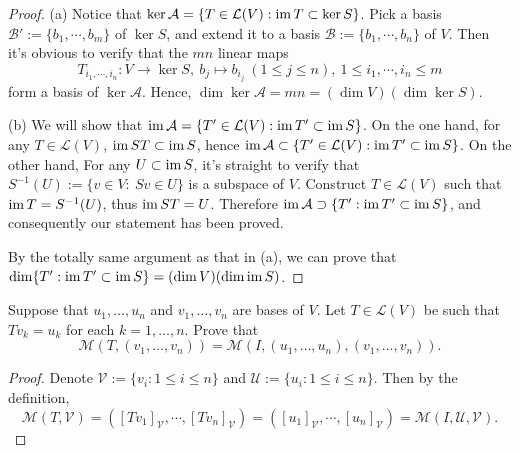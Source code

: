 \documentclass{article}
\begin{document}
\begin{proof}
    (a) Notice that \( \ker \mathcal{A}=\left\{T\in \mathcal{L}(V):\operatorname{im} T\subset\ker S\right\} \). Pick a basis \( \mathcal{B'}:=\{b_1,\cdots,b_m\} \) of \( \ker S \), and extend it to a basis \( \mathcal{B}:=\{b_1,\cdots,b_n\} \) of \( V \). Then it's obvious to verify that the \( mn \) linear maps
    \[ T_{i_1,\cdots,i_n}:V\to\ker S,\ b_j\mapsto b_{i_j}\ (1\le j\le n),\ 1\le i_1,\cdots,i_n\le m  \] 
    form a basis of \( \ker \mathcal{A} \). Hence, \( \dim\ker\mathcal{A}=mn=(\dim V)(\dim\ker S) \). \par
    (b) We will show that \( \operatorname{im} \mathcal{A}=\{T'\in \mathcal{L}(V):\operatorname{im} T'\subset\operatorname{im} S\} \). On the one hand, for any \( T\in \mathcal{L}(V) \), \( \operatorname{im} ST\subset\operatorname{im} S \), hence \( \operatorname{im} \mathcal{A}\subset\{T'\in \mathcal{L}(V):\operatorname{im} T'\subset\operatorname{im} S\} \). On the other hand, For any \( U\subset\operatorname{im} S \), it's straight to verify that \( S^{-1}(U):=\{v\in V:\ Sv\in U\} \) is a subspace of \( V \). Construct \( T\in \mathcal{L}(V) \) such that \( \operatorname{im} T=S^{-1}(U) \), thus \( \operatorname{im} ST=U \). Therefore \( \operatorname{im} \mathcal{A}\supset\{T':\operatorname{im} T'\subset\operatorname{im} S\} \), and consequently our statement has been proved.\par
    By the totally same argument as that in (a), we can prove that \( \dim \{T':\operatorname{im} T'\subset\operatorname{im} S\}=(\dim V)(\dim\operatorname{im} S) \). 
\end{proof}

\begin{problem}[3D-23]
    Suppose that \( u_1,\ldots,u_n \) and \( v_1,\ldots,v_n \) are bases of \( V \). Let \( T\in\mathcal{L}(V) \) be such that \( Tv_k=u_k \) for each \( k=1,\ldots,n \). Prove that
    \[
        \mathcal{M}(T,(v_1,\ldots,v_n))=\mathcal{M}(I,(u_1,\ldots,u_n),(v_1,\ldots,v_n)).
    \]
\end{problem}

\begin{proof}
    Denote \( \mathcal{V}:=\{v_i:1\le i\le n\} \) and \( \mathcal{U}:=\{u_i:1\le i\le n\} \). Then by the definition,
    \[ \mathcal{M}(T,\mathcal{V})=\left([Tv_1]_\mathcal{V},\cdots,[Tv_n]_\mathcal{V}\right)=\left([u_1]_\mathcal{V},\cdots,[u_n]_\mathcal{V}\right)=\mathcal{M}(I,\mathcal{U},\mathcal{V}). \] 
\end{proof}
\end{document}
